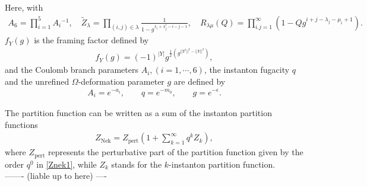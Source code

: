 \documentclass[11pt,a4paper]{article}
\begin{document}
Here, 
with 
\begin{align}
A_6 
= \prod_{i=1}^5 A_i{}^{-1}, 
\quad
\tilde{Z}_{\lambda} 
= \prod_{(i,j) \in \lambda} \frac{1}{1 - g^{\lambda_i + \lambda^t_j - i - j - 1} } , 
\quad
R_{\lambda \mu } (Q)= \prod_{i.j=1}^{\infty} (1 - Q g^{i+j-\lambda_j - \mu_i +1}).
\end{align}
$f_{Y}(g)$ is the framing factor defined by
\begin{align}
f_Y(g) = (-1)^{|Y|}g^{\frac{1}{2}(g^{||Y^t||^2 - ||Y||^2})},
\end{align}
and the Coulomb branch parameters $A_i, (i=1, \cdots, 6)$, the instanton fugacity $q$ and the unrefined $\Omega$-deformation parameter $g$ are defined by 
\begin{align}
A_i = e^{-a_i}, \qquad q = e^{-m_0}, \qquad g=e^{-\epsilon}.
\end{align}

The partition function can be written as a sum of the instanton partition functions 
\begin{align}
Z_{\text{Nek}} = Z_{\text{pert}}\left(1 + \sum_{k=1}^{\infty}q^kZ_k\right) ,
\end{align}
where $Z_{\text{pert}}$ represents the perturbative part of the partition function given by the order $q^0$ in \eqref{Znek1}, while $Z_k$ stands for the $k$-instanton partition function. \\
------- (liable up to here) ----\\
\end{document}

